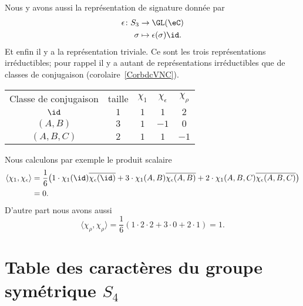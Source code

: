 Nous y avons aussi la représentation de signature donnée par
\begin{equation}
	\begin{aligned}
		\epsilon\colon S_3 & \to \GL(\eC)                 \\
		\sigma             & \mapsto \epsilon(\sigma)\id.
	\end{aligned}
\end{equation}
Et enfin il y a la représentation triviale. Ce sont les trois représentations irréductibles; pour rappel il y a autant de représentations irréductibles que de classes de conjugaison (corolaire~\ref{CorbdcVNC}).

\begin{center}
	\begin{tabular}[]{ccccc}
		Classe de conjugaison & taille & \( \chi_1\) & \( \chi_{\epsilon}\) & \( \chi_{\rho}\) \\
		\( \id\)              & \( 1\) & \( 1\)      & \( 1\)               & \( 2\)           \\
		\( (A,B)\)            & \( 3\) & \( 1\)      & \( -1\)              & \( 0\)           \\
		\( (A,B,C)\)          & \( 2\) & \( 1\)      & \( 1\)               & \( -1\)          \\
	\end{tabular}
\end{center}

Nous calculons par exemple le produit scalaire
\begin{subequations}
	\begin{align}
		\langle \chi_1, \chi_{\epsilon}\rangle & =\frac{1}{ 6 }\big( 1\cdot\chi_1(\id)\overline{ \chi_{\epsilon}(\id) }+3\cdot \chi_1(A,B)\overline{ \chi_{\epsilon}(A,B) }+2\cdot \chi_1(A,B,C)\overline{ \chi_{\epsilon}(A,B,C) } \big) \\
		                                       & =0.
	\end{align}
\end{subequations}
D'autre part nous avons aussi
\begin{equation}
	\langle \chi_{\rho}, \chi_{\rho}\rangle =\frac{1}{ 6 }(1\cdot2\cdot 2+3\cdot 0+2\cdot 1)=1.
\end{equation}

\section{Table des caractères du groupe symétrique \texorpdfstring{\(  S_4\)}{S4}}
\label{SecUMIgTmO}

